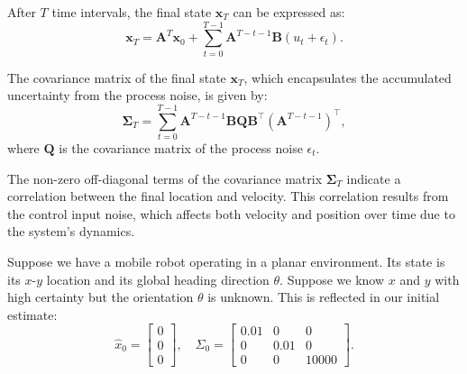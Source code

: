 \documentclass[answers]{exam}
\begin{document}
\begin{questions}
\begin{parts}
\begin{solution}
            After \( T \) time intervals, the final state \( \mathbf{x}_T \) can be expressed as:
            \[ \mathbf{x}_T = \mathbf{A}^T \mathbf{x}_0 + \sum_{t=0}^{T-1} \mathbf{A}^{T-t-1} \mathbf{B} (u_t + \epsilon_t). \]
            
            The covariance matrix of the final state \( \mathbf{x}_T \), which encapsulates the accumulated uncertainty from the process noise, is given by:
            \[ \mathbf{\Sigma}_T = \sum_{t=0}^{T-1} \mathbf{A}^{T-t-1} \mathbf{B} \mathbf{Q} \mathbf{B}^\top (\mathbf{A}^{T-t-1})^\top, \]
            where \( \mathbf{Q} \) is the covariance matrix of the process noise \( \epsilon_t \).
            
            The non-zero off-diagonal terms of the covariance matrix \( \mathbf{\Sigma}_T \) indicate a correlation between the final location and velocity. This correlation results from the control input noise, which affects both velocity and position over time due to the system's dynamics.
        \end{solution}
                   
    \end{parts}

    \question[20]
    Suppose we have a mobile robot operating in a planar environment. Its state is its \(x\)-\(y\) location and its global heading direction \(\theta\). Suppose we know \(x\) and \(y\) with high certainty but the orientation \(\theta\) is unknown. This is reflected in our initial estimate:
    \[
    \hat{x}_0 = \begin{bmatrix} 0 \\ 0 \\ 0 \end{bmatrix}, \quad
    \Sigma_0 = \begin{bmatrix} 0.01 & 0 & 0 \\ 0 & 0.01 & 0 \\ 0 & 0 & 10000 \end{bmatrix}.
    \]
\end{questions}
\end{document}
